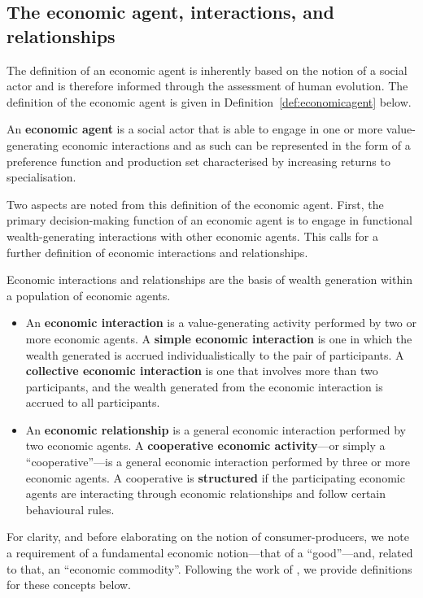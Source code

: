 \subsection{The economic agent, interactions, and relationships}

The definition of an economic agent is inherently based on the notion of a social actor and is therefore informed through the assessment of human evolution. The definition of the economic agent is given in Definition~\ref{def:economicagent} below.
\begin{definition} \label{def:economicagent}
An \textbf{economic agent} is a social actor that is able to engage in one or more value-generating economic interactions and as such can be represented in the form of a preference function and production set characterised by increasing returns to specialisation.
\end{definition}
Two aspects are noted from this definition of the economic agent. First, the primary decision-making function of an economic agent is to engage in functional wealth-generating interactions with other economic agents. This calls for a further definition of economic interactions and relationships.
\begin{definition}
Economic interactions and relationships are the basis of wealth generation within a population of economic agents.
\begin{itemize}
\item An \textbf{economic interaction} is a value-generating activity performed by two or more economic agents. A \textbf{simple economic interaction} is one in which the wealth generated is accrued individualistically to the pair of participants. A \textbf{collective economic interaction} is one that involves more than two participants, and the wealth generated from the economic interaction is accrued to all participants.

\item An \textbf{economic relationship} is a general economic interaction performed by two economic agents. A \textbf{cooperative economic activity}---or simply a ``cooperative''---is a general economic interaction performed by three or more economic agents. A cooperative is \textbf{structured} if the participating economic agents are interacting through economic relationships and follow certain behavioural rules.
\end{itemize}
\end{definition}
For clarity, and before elaborating on the notion of consumer-producers, we note a requirement of a fundamental economic notion---that of a ``good''---and, related to that, an ``economic commodity''. Following the work of \citet{Lancaster1966}, we provide definitions for these concepts below.
